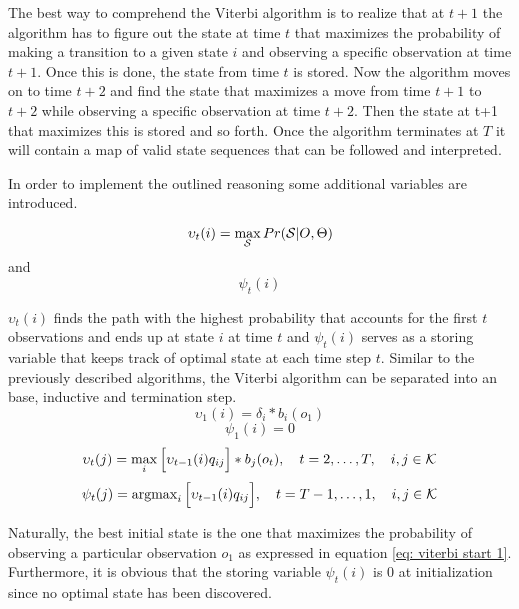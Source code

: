 The best way to comprehend the Viterbi algorithm is to realize that at $t+1$ the algorithm has to figure out the state at time $t$ that maximizes the probability of making a transition to a given state $i$ and observing a specific observation at time $t+1$. Once this is done, the state from time $t$ is stored. Now the algorithm moves on to time $t+2$ and find the state that maximizes a move from time $t+1$ to $t+2$ while observing a specific observation at time $t+2$. Then the state at t+1 that maximizes this is stored and so forth. Once the algorithm terminates at $T$ it will contain a map of valid state sequences that can be followed and interpreted. 

In order to implement the outlined reasoning some additional variables are introduced.

\begin{equation}
    \upsilon_t(i) =  \max_{\S}Pr(\S|O, \Theta)
\end{equation}
and 
$$
{\psi_t(i)}
$$

$\upsilon_t(i)$ finds the path with the highest probability that accounts for the first $t$ observations and ends up at state $i$ at time $t$ and $\psi_t(i)$ serves as a storing variable that keeps track of optimal state at each time step $t$. Similar to the previously described algorithms, the Viterbi algorithm can be separated into an base, inductive and termination step.
\begin{equation}
    \upsilon_1(i) = \delta_i*b_i(o_1)
    \label{eq: viterbi start 1}
\end{equation}
\begin{equation}
     \psi_1(i) = 0 
\end{equation}
\begin{equation}
    \upsilon_t(j) = \max_{i}\Big[\upsilon_{t-1}(i)q_{ij}\Big] *b_j(o_t),
    \quad t=2,\ldots,T , \quad i,j \in \K 
    \label{eq: inductive viterbi}
\end{equation}
\begin{equation}
    \psi_t(j) = {\argmax_{i} \Big[\upsilon_{t-1}(i)q_{ij}\Big]},
    \quad {t= T-1,\ldots,1}, \quad i,j\in\K
    \label{eq: inductive viterbi 2}
\end{equation}

Naturally, the best initial state is the one that maximizes the probability of observing a particular observation $o_1$ as expressed in equation \ref{eq: viterbi start 1}. Furthermore, it is obvious that the storing variable $\psi_t(i)$ is 0 at initialization since no optimal state has been discovered.


